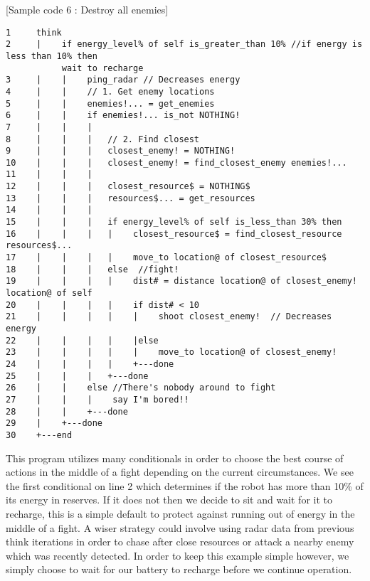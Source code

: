 \documentclass[a4paper]{article}
\begin{document}
[Sample code 6 : Destroy all enemies]
\begin{verbatim}
1     think
2     |    if energy_level% of self is_greater_than 10% //if energy is less than 10% then
           wait to recharge
3     |    |    ping_radar // Decreases energy
4     |    |    // 1. Get enemy locations
5     |    |    enemies!... = get_enemies
6     |    |    if enemies!... is_not NOTHING!
7     |    |    |
8     |    |    |   // 2. Find closest
9     |    |    |   closest_enemy! = NOTHING!
10    |    |    |   closest_enemy! = find_closest_enemy enemies!...
11    |    |    |
12    |    |    |   closest_resource$ = NOTHING$
13    |    |    |   resources$... = get_resources
14    |    |    |
15    |    |    |   if energy_level% of self is_less_than 30% then
16    |    |    |   |    closest_resource$ = find_closest_resource resources$...
17    |    |    |   |    move_to location@ of closest_resource$  
18    |    |    |   else  //fight!  
19    |    |    |   |    dist# = distance location@ of closest_enemy! location@ of self
20    |    |    |   |    if dist# < 10
21    |    |    |   |    |    shoot closest_enemy!  // Decreases energy
22    |    |    |   |    |else
23    |    |    |   |    |    move_to location@ of closest_enemy!
24    |    |    |   |    +---done
25    |    |    |   +---done
26    |    |    else //There's nobody around to fight
27    |    |    |    say I'm bored!!               
28    |    |    +---done
29    |    +---done
30    +---end
\end{verbatim}

This program utilizes many conditionals in order to choose the best course of actions in the middle of a fight depending on the current circumstances. We see the first conditional on line 2 which determines if the robot has more than 10\% of its energy in reserves. If it does not then we decide to sit and wait for it to recharge, this is a simple default to protect against running out of energy in the middle of a fight. A wiser strategy could involve using radar data from previous think iterations in order to chase after close resources or attack a nearby enemy which was recently detected. In order to keep this example simple however, we simply choose to wait for our battery to recharge before we continue operation.\\
\end{document}
